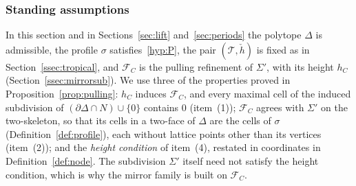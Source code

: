 \subsubsection*{Standing assumptions}
In this section and in Sections~\ref{sec:lift} and~\ref{sec:periods} the polytope $\Delta$ is admissible, the profile $\sigma$
satisfies~\ref{hyp:P}, the pair $(\mathcal T,\check h)$ is fixed as in Section~\ref{ssec:tropical}, and $\mathcal F_C$ is
the pulling refinement of $\Sigma'$, with its height $h_C$ (Section~\ref{ssec:mirrorsub}). We use three of the properties
proved in Proposition~\ref{prop:pulling}: $h_C$ induces $\mathcal F_C$, and every maximal cell of the induced subdivision of
$(\partial\Delta\cap N)\cup\{0\}$ contains $0$ (item~(1)); $\mathcal F_C$ agrees with $\Sigma'$ on the two-skeleton, so that its
cells in a two-face of $\Delta$ are the cells of $\sigma$ (Definition~\ref{def:profile}), each without lattice points other
than its vertices (item~(2)); and the \emph{height condition} of item~(4), restated in coordinates in
Definition~\ref{def:node}. The subdivision $\Sigma'$ itself need not satisfy the height condition, which is why the mirror
family is built on $\mathcal F_C$.

